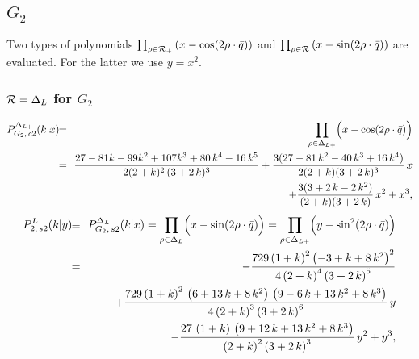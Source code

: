 \documentclass[a4paper,12pt]{article}
\begin{document}
\subsection{$G_2$}

Two types of polynomials
$\prod_{\rho\in{{\cal R}}_+}\left(x-\cos(2\rho\cdot\bar{q})\right)$ and
$\prod_{\rho\in{\cal R}}\left(x-\sin(2\rho\cdot\bar{q})\right)$ are evaluated.
For the latter we use $y=x^2$.

\subsubsection{${\cal R}=\Delta_L$ for $G_2$}

\begin{eqnarray}
   P_{G_2,\,c2}^{\Delta_{L+}}(k|x)&\!\!=\!\!&\prod_{\rho\in{\Delta_{L+}}}
   \Bigl(x-\cos(2\rho\cdot\bar{q})\Bigr)\nonumber\\
%
   &\!\!=\!\!&\frac{27 - 81k - 99k^2 + 107k^3 + 80\,k^4 - 16\,k^5}
     {2(2 + k)^2\, (3 + 2\,k)^3} +
    \frac{3( 27 - 81\,k^2 - 40\,k^3 + 16\,k^4)}{2( 2 + k)(3 + 2\,k)^3}\,x
   \nonumber\\
   && + \frac{3(3 + 2\,k - 2\,k^2)} {( 2 + k)(3 + 2\,k)}\,x^2 + x^3,
\end{eqnarray}
\begin{eqnarray}
   P_{2,\,s2}^L(k|y)&\!\!\equiv\!\!&P_{G_2,\,s2}^{\Delta_{L}}(k|x)=
   \prod_{\rho\in{\Delta_{L}}}\Bigl(x-\sin(2\rho\cdot\bar{q})\Bigr)
   =\prod_{\rho\in{\Delta_{L+}}}\Bigl(y-\sin^2(2\rho\cdot\bar{q})\Bigr)
   \nonumber\\
%
   &\!\!=\!\!&-\frac{729\,{\left( 1 + k \right) }^2\,
       {\left( -3 + k + 8\,k^2 \right) }^2}{4\,
       {\left( 2 + k \right) }^4\,{\left( 3 + 2\,k \right) }^5}
   \nonumber\\
   &&
     + \frac{729\,{\left( 1 + k \right) }^2\,
       \left( 6 + 13\,k + 8\,k^2 \right) \,
       \left( 9 - 6\,k + 13\,k^2 + 8\,k^3 \right)}{4\,
       {\left( 2 + k \right) }^3\,{\left( 3 + 2\,k \right) }^6} \,y
   \nonumber\\
   &&
     - \frac{27\,\left( 1 + k \right) \,
       \left( 9 + 12\,k + 13\,k^2 + 8\,k^3 \right)}{
       {\left( 2 + k \right) }^2\,{\left( 3 + 2\,k \right) }^3} \,y^2
     + y^3,
\end{eqnarray}

\end{document}
